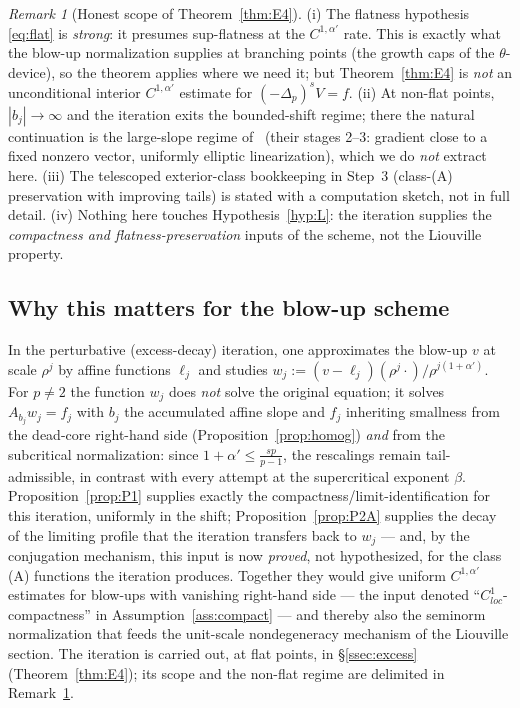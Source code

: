 \documentclass[11pt]{amsart}
\theoremstyle{plain}
\theoremstyle{definition}
\theoremstyle{remark}
\newtheorem{remark}[theorem]{Remark}
\newcommand{\fpl}[1]{(-\Delta_p)^{s}#1}
\newcommand{\al}{\alpha}
\begin{document}
\begin{remark}[Honest scope of Theorem~\ref{thm:E4}]\label{rem:E4-limits}
\textnormal{(i)} The flatness hypothesis \eqref{eq:flat} is \emph{strong}:
it presumes sup-flatness at the $C^{1,\al'}$ rate. This is exactly what the
blow-up normalization supplies at branching points \textnormal{(}the growth
caps of the $\theta$-device\textnormal{)}, so the theorem applies where we
need it; but Theorem~\ref{thm:E4} is \emph{not} an unconditional interior
$C^{1,\al'}$ estimate for $\fpl{V}=f$. \textnormal{(ii)} At non-flat
points, $|b_j|\to\infty$ and the iteration exits the bounded-shift regime;
there the natural continuation is the large-slope regime of~\cite{GJS}
\textnormal{(}their stages 2--3: gradient close to a fixed nonzero vector,
uniformly elliptic linearization\textnormal{)}, which we do \emph{not}
extract here. \textnormal{(iii)} The telescoped exterior-class bookkeeping
in Step~3 \textnormal{(}class-\textnormal{(A)} preservation with improving
tails\textnormal{)} is stated with a computation sketch, not in full
detail. \textnormal{(iv)} Nothing here touches
Hypothesis~\ref{hyp:L}: the iteration supplies the \emph{compactness and
flatness-preservation} inputs of the scheme, not the Liouville property.
\end{remark}

\subsection{Why this matters for the blow-up scheme}
In the perturbative (excess-decay) iteration, one approximates the blow-up
$v$ at scale $\rho^j$ by affine functions $\ell_j$ and studies
$w_j:=(v-\ell_j)(\rho^j\cdot)/\rho^{j(1+\al')}$. For $p\neq2$ the function
$w_j$ does \emph{not} solve the original equation; it solves
$A_{b_j}w_j=f_j$ with $b_j$ the accumulated affine slope and $f_j$ inheriting
smallness from the dead-core right-hand side
\textnormal{(}Proposition~\ref{prop:homog}\textnormal{)} \emph{and} from the
subcritical normalization: since $1+\al'\le\frac{sp}{p-1}$, the rescalings
remain tail-admissible, in contrast with every attempt at the supercritical
exponent $\beta$. Proposition~\ref{prop:P1} supplies exactly the
compactness/limit-identification for this iteration, uniformly in the shift;
Proposition~\ref{prop:P2A} supplies the decay of the limiting profile that
the iteration transfers back to $w_j$ --- and, by the conjugation mechanism,
this input is now \emph{proved}, not hypothesized, for the class
\textnormal{(A)} functions the iteration produces. Together they would give
uniform $C^{1,\al'}$ estimates for blow-ups with vanishing right-hand side
--- the input denoted ``$C^1_{loc}$-compactness'' in
Assumption~\ref{ass:compact} --- and thereby also the seminorm normalization
that feeds the unit-scale nondegeneracy mechanism of the Liouville section.
The iteration is carried out, at flat points, in
\S\ref{ssec:excess} (Theorem~\ref{thm:E4}); its scope and the non-flat
regime are delimited in Remark~\ref{rem:E4-limits}.
\end{document}
